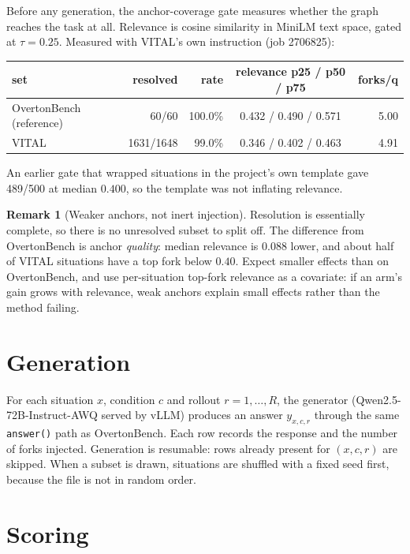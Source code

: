 \documentclass[11pt]{article}
\theoremstyle{definition}
\newtheorem{remark}{Remark}
\newcommand{\1}{\mathbf{1}}
\begin{document}
Before any generation, the anchor-coverage gate measures whether the graph reaches
the task at all. Relevance is cosine similarity in MiniLM text space, gated at
$\tau = 0.25$. Measured with VITAL's own instruction (job 2706825):

\begin{table}[h]
\centering
\small
\begin{tabular}{@{}lrrcr@{}}
\toprule
set & resolved & rate & relevance p25 / p50 / p75 & forks/q \\
\midrule
OvertonBench (reference) & 60/60 & 100.0\% & 0.432 / 0.490 / 0.571 & 5.00 \\
VITAL & 1631/1648 & 99.0\% & 0.346 / 0.402 / 0.463 & 4.91 \\
\bottomrule
\end{tabular}
\end{table}

\noindent
An earlier gate that wrapped situations in the project's own template gave
489/500 at median $0.400$, so the template was not inflating relevance.

\begin{remark}[Weaker anchors, not inert injection]
Resolution is essentially complete, so there is no unresolved subset to split off.
The difference from OvertonBench is anchor \emph{quality}: median relevance is
$0.088$ lower, and about half of VITAL situations have a top fork below $0.40$.
Expect smaller effects than on OvertonBench, and use per-situation top-fork
relevance as a covariate: if an arm's gain grows with relevance, weak anchors
explain small effects rather than the method failing.
\end{remark}

\section{Generation}

For each situation $x$, condition $c$ and rollout $r = 1,\dots,R$, the generator
(Qwen2.5-72B-Instruct-AWQ served by vLLM) produces an answer $y_{x,c,r}$ through
the same \texttt{answer()} path as OvertonBench. Each row records the response and
the number of forks injected. Generation is resumable: rows already present for
$(x, c, r)$ are skipped. When a subset is drawn, situations are shuffled with a
fixed seed first, because the file is not in random order.

\section{Scoring}
\end{document}
